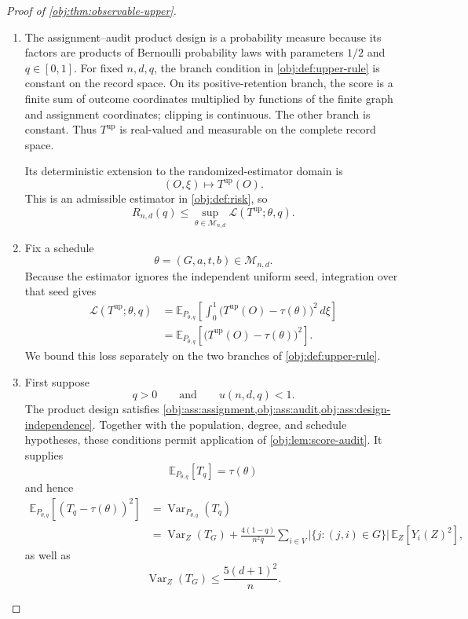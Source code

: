 \documentclass[11pt]{article}
\begin{document}
\begin{proof}[Proof of \cref{obj:thm:observable-upper}]
\begin{enumerate}
\item
The assignment--audit product design is a probability measure because its factors are products of Bernoulli probability laws with parameters \(1/2\) and \(q\in[0,1]\). For fixed \(n,d,q\), the branch condition in \cref{obj:def:upper-rule} is constant on the record space. On its positive-retention branch, the score is a finite sum of outcome coordinates multiplied by functions of the finite graph and assignment coordinates; clipping is continuous. The other branch is constant. Thus \(T^{\mathrm{up}}\) is real-valued and measurable on the complete record space.

Its deterministic extension to the randomized-estimator domain is
\[
(O,\xi)\longmapsto T^{\mathrm{up}}(O).
\]
This is an admissible estimator in \cref{obj:def:risk}, so
\[
R_{n,d}(q)
\le
\sup_{\theta\in\mathcal M_{n,d}}
\mathcal L(T^{\mathrm{up}};\theta,q).
\]

\item
Fix a schedule
\[
\theta=(G,a,t,b)\in\mathcal M_{n,d}.
\]
Because the estimator ignores the independent uniform seed, integration over that seed gives
\[
\begin{aligned}
\mathcal L(T^{\mathrm{up}};\theta,q)
&=
\mathbb E_{P_{\theta,q}}
\left[
\int_0^1
\bigl(T^{\mathrm{up}}(O)-\tau(\theta)\bigr)^2\,d\xi
\right]\\
&=
\mathbb E_{P_{\theta,q}}
\left[
\bigl(T^{\mathrm{up}}(O)-\tau(\theta)\bigr)^2
\right].
\end{aligned}
\]
We bound this loss separately on the two branches of \cref{obj:def:upper-rule}.

\item
First suppose
\[
q>0
\qquad\text{and}\qquad
u(n,d,q)<1.
\]
The product design satisfies \cref{obj:ass:assignment,obj:ass:audit,obj:ass:design-independence}. Together with the population, degree, and schedule hypotheses, these conditions permit application of \cref{obj:lem:score-audit}. It supplies
\[
\mathbb E_{P_{\theta,q}}[T_q]=\tau(\theta)
\]
and hence
\[
\begin{aligned}
\mathbb E_{P_{\theta,q}}
\left[(T_q-\tau(\theta))^2\right]
&=\operatorname{Var}_{P_{\theta,q}}(T_q)\\
&=\operatorname{Var}_{Z}(T_G)
+\frac{4(1-q)}{n^2q}
\sum_{i\in V}
\bigl|\{j:(j,i)\in G\}\bigr|
\,\mathbb E_Z[Y_i(Z)^2],
\end{aligned}
\]
as well as
\[
\operatorname{Var}_{Z}(T_G)\le\frac{5(d+1)^2}{n}.
\]


\end{enumerate}
\end{proof}
\end{document}
